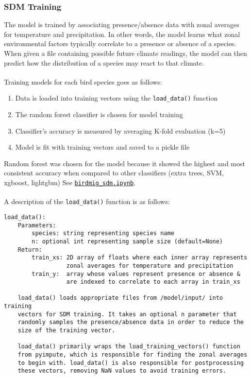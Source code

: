 \documentclass{article}
\begin{document}
\subsubsection{SDM Training}
The model is trained by associating presence/absence data with zonal averages for temperature and precipitation. In other words, the model learns what zonal environmental factors typically correlate to a presence or absence of a species. When given a file containing possible future climate readings, the model can then predict how the distribution of a species may react to that climate.
\\\\
Training models for each bird species goes as follows:
\begin{enumerate}
	\item Data is loaded into training vectors using the \texttt{load\_data()} function
	\item The random forest classifier is chosen for model training
	\item Classifier's accuracy is measured by averaging K-fold evaluation (k=5)
	\item Model is fit with training vectors and saved to a pickle file
\end{enumerate}

\noindent Random forest was chosen for the model because it showed the highest and most consistent accuracy when compared to other classifiers (extra trees, SVM, xgboost, lightgbm) See \texttt{\href{run:../model/birdmig\_sdm.ipynb}{birdmig\_sdm.ipynb}}.
\\\\
A description of the \texttt{load\_data()} function is as follows:
\begin{Verbatim}[tabsize=4]
load_data():
	Parameters:
		species: string representing species name
		n: optional int representing sample size (default=None)
	Return:
		train_xs: 2D array of floats where each inner array represents 
				  zonal averages for temperature and precipitation 
		train_y:  array whose values represent presence or absence & 
				  are indexed to correlate to each array in train_xs
				  
	load_data() loads appropriate files from /model/input/ into training 
	vectors for SDM training. It takes an optional n parameter that
	randomly samples the presence/absence data in order to reduce the
	size of the training vector.
	
	load_data() primarily wraps the load_training_vectors() function 
	from pyimpute, which is responsible for finding the zonal averages
	to begin with. load_data() is also responsible for postprocessing 
	these vectors, removing NaN values to avoid training errors.
\end{Verbatim}
\end{document}
